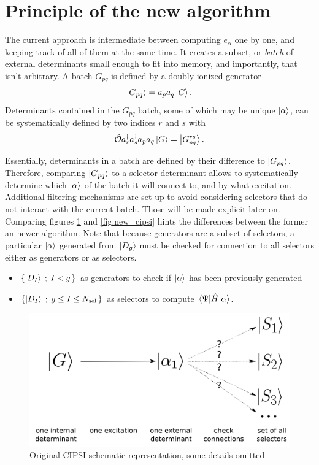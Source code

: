 \documentclass[./thesis.tex]{subfiles}
\begin{document}
\section{Principle of the new algorithm}

The current approach is intermediate between computing $e_\alpha$ one by one, and keeping track of all of them at the same time.
It creates a subset, or \emph{batch} of external determinants small enough to fit into memory, and importantly, that isn't arbitrary.
A batch $G_{pq}$ is defined by a doubly ionized generator
\begin{equation}
\ket {G_{pq}} = a_p a_q \ket G.
\end{equation}
Determinants contained in the $G_{pq}$ batch, some of which may be unique ${\ket{\alpha}}$, can be systematically defined by two indices $r$ and $s$ with
\begin{equation}
{\hat{\mathcal{O}}} a^\dagger_r a^\dagger_s a_p a_q  \ket G = \ket{G^{rs}_{pq}}.
\end{equation}

Essentially, determinants in a batch are defined by their difference to $\ket{G_{pq}}$. Therefore, comparing $\ket{G_{pq}}$ to a selector determinant allows to systematically determine which ${\ket{\alpha}}$ of the batch it will connect to, and by what excitation. Additional filtering mechanisms are set up to avoid considering selectors that do not interact with the current batch. Those will be made explicit later on. Comparing figures \ref{fig:old_cipsi} and \ref{fig:new_cipsi} hints the differences between the former an newer algorithm. Note that because generators are a subset of selectors, a particular ${\ket{\alpha}}$ generated from $\ket{D_g}$ must be checked for connection to all selectors either as generators or as selectors.

\begin{itemize}
\item
$\left \{\ket{D_I} \; ; \; I < g \, \right \}$ as generators to check if ${\ket{\alpha}}$ has been previously generated
\item
$\left \{\ket{D_I} \; ; \; g \le I \le {N_\text{sel}} \, \right \}$ as selectors to compute $\mel{\Psi}{\hat{H}}{\alpha}$.
\end{itemize}


\begin{figure}[h!]
        \begin{center}
                \includegraphics[width=0.6\columnwidth]{figures/cipsi/old_cipsi}
        \end{center}
        \caption{Original CIPSI schematic representation, some details omitted}
        \label{fig:old_cipsi}
\end{figure}
\end{document}
